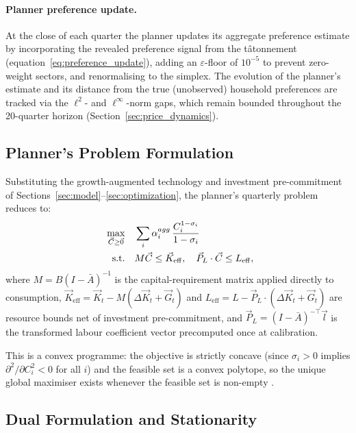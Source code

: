 \paragraph{Planner preference update.}
At the close of each quarter the planner updates its aggregate preference
estimate by incorporating the revealed preference signal from the
tâtonnement (equation~\eqref{eq:preference_update}), adding an $\varepsilon$-floor of $10^{-5}$ to prevent
zero-weight sectors, and renormalising to the simplex.
The evolution of the planner's estimate and its distance from the true
(unobserved) household preferences are tracked via the $\ell^2$- and
$\ell^\infty$-norm gaps, which remain bounded throughout the 20-quarter
horizon (Section~\ref{sec:price_dynamics}).

\subsection{Planner's Problem Formulation}

Substituting the growth-augmented technology and investment
pre-commitment of Sections~\ref{sec:model}--\ref{sec:optimization},
the planner's quarterly problem reduces to:
%
\begin{align}\label{eq:solver problem}
\max_{\vec{C}\geq \vec{0}} \quad & \sum_i \alpha^{agg}_i
  \,\frac{C_i^{1-\sigma_i}}{1-\sigma_i} \notag \\
  \quad\text{s.t.}\quad
  & M\vec{C} \leq \vec{K}_{\mathrm{eff}},\quad
  \vec{P}_{L} \cdot \vec{C} \leq L_{\mathrm{eff}},
\end{align}
%
where $M = B(I-\bar{A})^{-1}$ is the capital-requirement matrix
applied directly to consumption,
$\vec{K}_{\mathrm{eff}} = \vec{K}_t - M (\Delta\vec{K}_t + \vec{G}_{t})$ and
$L_{\mathrm{eff}} = L - \vec{P}_{L} \cdot ( \Delta\vec{K}_t + \vec{G}_{t})$
are resource bounds net of investment pre-commitment, and
$\vec{P}_{L} = (I-\bar{A})^{-\top}\vec{l}$ is the
transformed labour coefficient vector precomputed once at calibration.

This is a convex programme: the objective is strictly concave (since
$\sigma_i > 0$ implies $\partial^2/\partial C_i^2 < 0$ for all $i$)
and the feasible set is a convex polytope, so the unique global maximiser exists
whenever the feasible set is non-empty \citep{boyd2004convex}.

\subsection{Dual Formulation and Stationarity}

